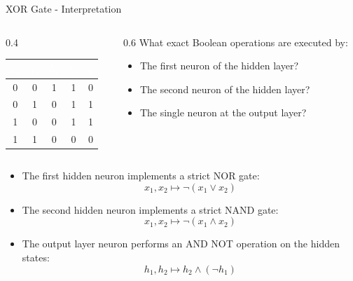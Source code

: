 \begin{frame}{XOR Gate - Interpretation}
	\begin{columns}
		\begin{column}{0.4\textwidth}
			\begin{table}
				\centering
				\renewcommand{\arraystretch}{1.3} 
				\begin{tabular}{|c|c|c|c|c|}
					\hline
					\rowcolor{blue!80!black} 
					\textcolor{white}{\textbf{$x_1$}} & 
					\textcolor{white}{\textbf{$x_2$}} & 
					\textcolor{white}{\textbf{$h_1$}} & 
					\textcolor{white}{\textbf{$h_2$}} & 
					\textcolor{white}{\textbf{$\hat{y}$}} \\
					\hline
					0 & 0 & 1 & 1 & 0 \\
					\hline
					0 & 1 & 0 & 1 & 1 \\
					\hline
					1 & 0 & 0 & 1 & 1 \\
					\hline
					1 & 1 & 0 & 0 & 0 \\
					\hline
				\end{tabular}
			\end{table}
		\end{column}
		\begin{column}{0.6\textwidth}
			What exact Boolean operations are executed by:
			\begin{itemize}
				\item The first neuron of the hidden layer?
				\item The second neuron of the hidden layer?
				\item The single neuron at the output layer?
			\end{itemize}
		\end{column}
	\end{columns}
	
	\pause
	\vspace{0.3cm}
	
	\begin{itemize}
		\item The first hidden neuron implements a strict NOR gate:
		\begin{equation*}
			x_1, x_2 \mapsto \neg \left(x_1 \lor x_2\right)
		\end{equation*}
		\item The second hidden neuron implements a strict NAND gate:
		\begin{equation*}
			x_1, x_2 \mapsto \neg \left(x_1 \land x_2\right)
		\end{equation*}
		\item The output layer neuron performs an AND NOT operation on the hidden states: 
		\begin{equation*}
			h_1, h_2 \mapsto h_2 \land \left(\neg h_1 \right)
		\end{equation*}
	\end{itemize}
\end{frame}

